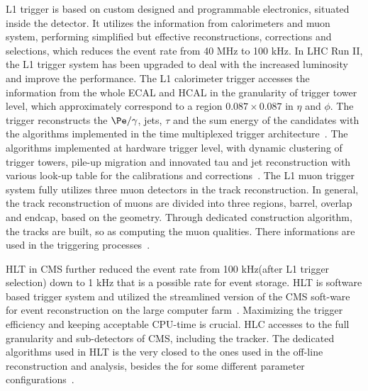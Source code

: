 L1 trigger is based on custom designed and programmable electronics, situated inside the detector. It utilizes the information from calorimeters and muon system, performing simplified but effective reconstructions, corrections and selections, which reduces the event rate from 40 MHz to 100 kHz. In LHC Run II, the L1 trigger system has been upgraded to deal with the increased luminosity and improve the performance. The L1 calorimeter trigger accesses the information from the whole ECAL and HCAL in the granularity of trigger tower level, which approximately correspond to a region $0.087\times0.087$ in $\eta$ and $\phi$. The trigger reconstructs the $\Pe/\gamma$, jets, $\tau$ and the sum energy of the candidates with the algorithms implemented in the time multiplexed trigger architecture~\cite{TMT_trigger}. The algorithms implemented at hardware trigger level, with dynamic clustering of trigger towers, pile-up migration and innovated tau and jet reconstruction with various look-up table for the calibrations and corrections~\cite{L1_Egamma}. The L1 muon trigger system fully utilizes three muon detectors in the track reconstruction. In general, the track reconstruction of muons are divided into three regions, barrel, overlap and endcap, based on the geometry. Through dedicated construction algorithm, the tracks are built, so as computing the muon qualities. There informations are used in the triggering processes~\cite{L1muontrigger}. 


HLT in CMS further reduced the event rate from 100 kHz(after L1 trigger selection) down to 1 kHz that is a possible rate for event storage. HLT is software based trigger system and utilized the streamlined version of the CMS soft-ware for event reconstruction on the large computer farm~\cite{CMS_trigger_RUNII}. Maximizing the trigger efficiency and keeping acceptable CPU-time is crucial. HLC accesses to the full granularity and sub-detectors of CMS, including the tracker. The dedicated algorithms used in HLT is the very closed to the ones used in the off-line reconstruction and analysis, besides the for some different parameter configurations~\cite{CMS_HLT_RunII}.             












